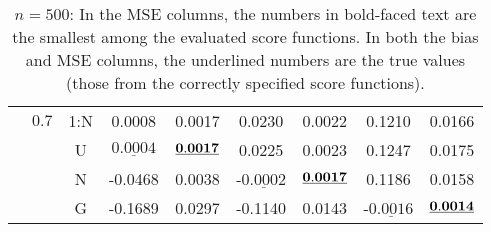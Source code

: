 \documentclass[12pt]{article}
\newcommand{\ul}{\underline}
\begin{document}
\begin{table}[htp!]
\begin{center}
{\begin{tabular}{|c|c|c|c|c|c|c|c|c| }
		        \cline{2-9}		
&		 $0.7$&1:N&    0.0008  & 0.0017    & 0.0230  & 0.0022 & 0.1210  & 0.0166    \\
&		   &U&$\ul{    0.0004}$  &${\bf\ul{ 0.0017}}$  & 0.0225  & 0.0023 & 0.1247  & 0.0175    \\
&		   &N&    -0.0468  & 0.0038    &-$\ul{0.0002}$  &${\bf\ul{ 0.0017}}$ & 0.1186  & 0.0158    \\
&		   &G&    -0.1689  & 0.0297    & -0.1140  & 0.0143 &-$\ul{0.0016}$  &${\bf\ul{ 0.0014}}$  \\ \hline
     \end{tabular}
       }
\bigskip
	   \caption{$n=500$: In the MSE columns, the numbers in bold-faced text are the smallest among the evaluated score functions. In both the bias and MSE columns, the underlined numbers are the true values (those from the correctly specified score functions).}
\end{center}
\end{table}		
\end{document}
